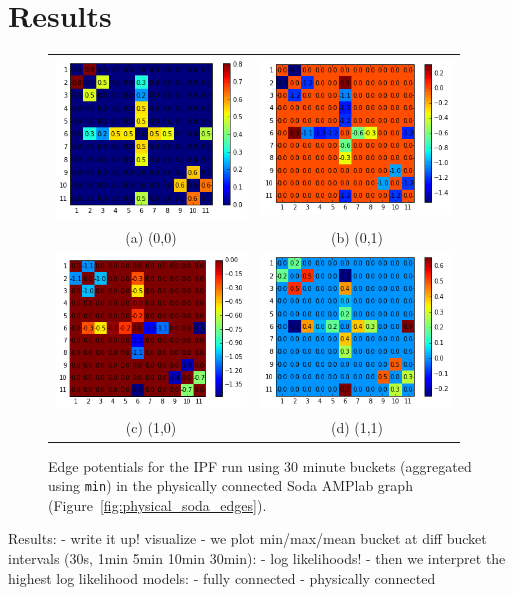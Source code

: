 \section{Results}

\begin{figure}
\centering
\begin{tabular}{cc}
\includegraphics[width=2in]{figs/30minmin00conf} & \includegraphics[width=2in]{figs/30minmin01conf} \\
(a) (0,0) & (b) (0,1) \\[6pt]
\includegraphics[width=2in]{figs/30minmin10conf} & \includegraphics[width=2in]{figs/30minmin11conf} \\
(c) (1,0) & (d) (1,1) \\[6pt]
\end{tabular}
\caption{Edge potentials for the IPF run using 30 minute buckets (aggregated using \texttt{min}) in the physically connected Soda AMPlab graph (Figure~\ref{fig:physical_soda_edges}).}
\label{fig:30minminphysical}
\end{figure}

Results:
- write it up! visualize
- we plot min/max/mean bucket at diff bucket intervals (30s, 1min 5min 10min 30min):
    - log likelihoods!
- then we interpret the highest log likelihood models:
    - fully connected
    - physically connected
\fi
